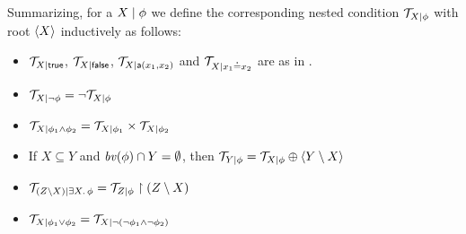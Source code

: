 Summarizing, for a {\cfor} ${X} \mid {\phi}$ we define the corresponding nested condition ${\mathcal{T}}_{{X} \mid {\phi}}$ with root $\langle X\rangle$ inductively as follows:

\begin{itemize}
	\item ${\mathcal{T}}_{{X} \mid {\mathsf{true}}}$, ${\mathcal{T}}_{{X} \mid {\mathsf{false}}}$, ${\mathcal{T}}_{{X} \mid {\mathsf{a}(x_1,x_2)}}$ and ${\mathcal{T}}_{{X} \mid {x_1\mathbin{\doteq}x_2}}$ are as in . 
	\item  ${\mathcal{T}}_{{X} \mid {\neg \phi}} = \neg {\mathcal{T}}_{{X} \mid {\phi}}$
	\item  ${\mathcal{T}}_{{X} \mid {\phi_1 \wedge \phi_2}} = {\mathcal{T}}_{{X} \mid {\phi_1}} \times {\mathcal{T}}_{{X} \mid {\phi_2}}$
	\item If $X \subseteq Y$ and $\mathit{bv}(\phi)\cap Y = \emptyset$, then ${\mathcal{T}}_{{Y} \mid {\phi}} =  {\mathcal{T}}_{{X} \mid {\phi}} \oplus \langle Y\setminus X\rangle$
	\item ${\mathcal{T}}_{{(Z \setminus X)} \mid {\exists X.\,\phi}} = {\mathcal{T}}_{{Z} \mid {\phi}} \restriction (Z\setminus X)$
	\item ${\mathcal{T}}_{{X} \mid {\phi_1 \vee \phi_2}} = {\mathcal{T}}_{{X} \mid {\neg( \neg \phi_1 \wedge \neg \phi_2)}}$
\end{itemize}


